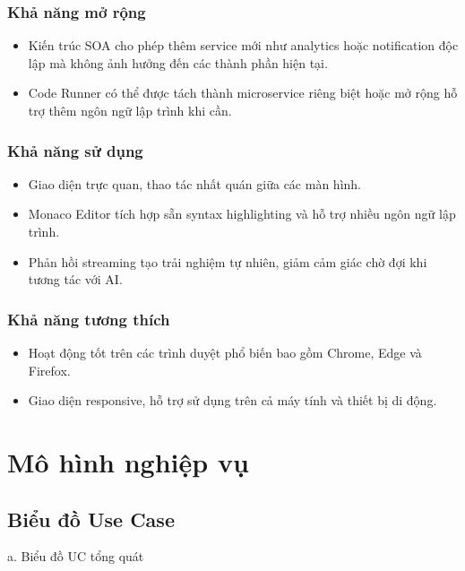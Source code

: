 \documentclass[../main.tex]{subfiles}
\begin{document}
\subsubsection{Khả năng mở rộng}

\begin{itemize}
    \item Kiến trúc SOA cho phép thêm service mới như analytics hoặc notification độc lập mà không ảnh hưởng đến các thành phần hiện tại.
    \item Code Runner có thể được tách thành microservice riêng biệt hoặc mở rộng hỗ trợ thêm ngôn ngữ lập trình khi cần.
\end{itemize}

\subsubsection{Khả năng sử dụng}

\begin{itemize}
    \item Giao diện trực quan, thao tác nhất quán giữa các màn hình.
    \item Monaco Editor tích hợp sẵn syntax highlighting và hỗ trợ nhiều ngôn ngữ lập trình.
    \item Phản hồi streaming tạo trải nghiệm tự nhiên, giảm cảm giác chờ đợi khi tương tác với AI.
\end{itemize}

\subsubsection{Khả năng tương thích}

\begin{itemize}
    \item Hoạt động tốt trên các trình duyệt phổ biến bao gồm Chrome, Edge và Firefox.
    \item Giao diện responsive, hỗ trợ sử dụng trên cả máy tính và thiết bị di động.
\end{itemize}

\section{Mô hình nghiệp vụ}

\subsection{Biểu đồ Use Case}

a. Biểu đồ UC tổng quát
\end{document}
